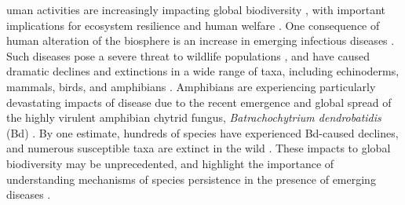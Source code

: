 \documentclass[9pt,twocolumn,twoside,lineno]{pnas-new}
\begin{document}


\maketitle
\thispagestyle{firststyle}


uman activities are increasingly impacting global biodiversity
\citep{ceballos2015}, with important implications for ecosystem
resilience and human welfare \citep{naeem2009}. One consequence of human
alteration of the biosphere is an increase in emerging infectious
diseases \citep{jones2008, fisher2012}. Such diseases pose a severe
threat to wildlife populations \citep{daszak2000}, and have caused
dramatic declines and extinctions in a wide range of taxa, including
echinoderms, mammals, birds, and amphibians
\citep{hewson2014, samuel2015, scheele2019, cunningham2021}. Amphibians
are experiencing particularly devastating impacts of disease due to the
recent emergence and global spread of the highly virulent amphibian
chytrid fungus, \emph{Batrachochytrium dendrobatidis} (Bd)
\citep{luedtke2023, scheele2019}. By one estimate, hundreds of species
have experienced Bd-caused declines, and numerous susceptible taxa are
extinct in the wild \citep{scheele2019}. These impacts to global
biodiversity may be unprecedented, and highlight the importance of
understanding mechanisms of species persistence in the presence of
emerging diseases \citep{russell2020}.
\end{document}
